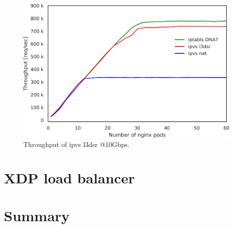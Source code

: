\begin{figure}[t]
  \centering
  \includegraphics[width=0.8\columnwidth]{Figs/ipvs_l3dsr_10g.png}
  \caption{Throughput of ipvs l3dsr @10Gbps.}
  \label{fig:ipvs_l3dsr_10g.png}
\end{figure}

\FloatBarrier

\section{XDP load balancer}

\section{Summary}



